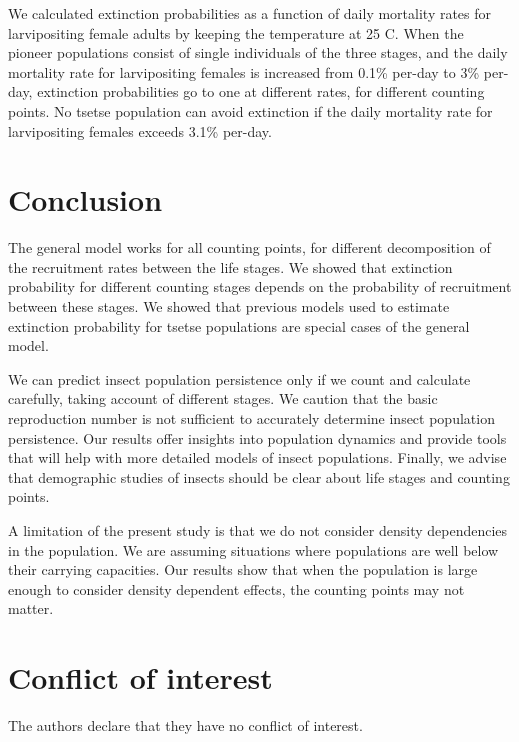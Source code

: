 \documentclass[smallextended]{svjour3}
\begin{document}
We calculated extinction probabilities as a function of daily mortality rates for larvipositing female adults by keeping the temperature at 25 \degree C. When the pioneer populations consist of single individuals of the three stages, and the daily mortality rate for larvipositing females is increased from 0.1\% per-day to 3\% per-day, extinction probabilities go to one at different rates, for different counting points. No tsetse population can avoid extinction if the daily mortality rate for larvipositing females exceeds 3.1\% per-day\cite{Are2019}.

\section{Conclusion}

The general model works for all counting points, for different decomposition of the recruitment rates between the life stages. We showed that extinction probability for different counting stages depends on the probability of recruitment between these stages. We showed that previous models used to estimate extinction probability for tsetse populations are special cases of the general model. 

We can predict insect population persistence only if we count and calculate carefully, taking account of different stages. We caution that the basic reproduction number is not sufficient to accurately determine insect population persistence. Our results offer insights into population dynamics and provide tools that will help with more detailed models of insect populations. Finally, we advise that demographic studies of insects should be clear about life stages and counting points.

A limitation of the present study is that we do not consider density dependencies in the population. We are assuming situations where populations are well below their carrying capacities. Our results show that when the population is large enough to consider density dependent effects, the counting points may not matter.


%
 \section*{Conflict of interest}
%
 The authors declare that they have no conflict of interest.
\end{document}
